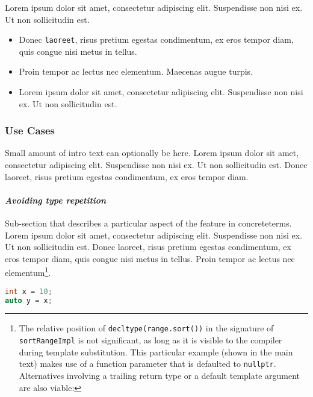\documentclass[twoside,10pt,letterpaper,usenames]{newstyle-PearsonGeneric-7-38}
\newcommand{\passthrough}[1]{\lstset{mathescape=false}#1\lstset{mathescape=true}}
\begin{document}
Lorem ipsum dolor sit amet, consectetur adipiscing elit. Suspendisse non
nisi ex. Ut non sollicitudin est.

\begin{itemize}
\item
  Donec \passthrough{\lstinline!laoreet!}, risus pretium egestas
  condimentum, ex eros tempor diam, quis congue nisi metus in tellus.
\item
  Proin tempor ac lectus nec elementum. Maecenas augue turpis.
\item
  Lorem ipsum dolor sit amet, consectetur adipiscing elit. Suspendisse
  non nisi ex. Ut non sollicitudin est.
\end{itemize}

\hypertarget{use-cases}{%
\subsubsection{Use Cases}\label{use-cases}}

Small amount of intro text can optionally be here. Lorem ipsum dolor sit
amet, consectetur adipiscing elit. Suspendisse non nisi ex. Ut non
sollicitudin est. Donec laoreet, risus pretium egestas condimentum, ex
eros tempor diam.

\hypertarget{avoiding-type-repetition}{%
\paragraph{\texorpdfstring{\emph{Avoiding type
repetition}}{Avoiding type repetition}}\label{avoiding-type-repetition}}

Sub-section that describes a particular aspect of the feature in
concreteterms. Lorem ipsum dolor sit amet, consectetur adipiscing elit.
Suspendisse non nisi ex. Ut non sollicitudin est. Donec laoreet, risus
pretium egestas condimentum, ex eros tempor diam, quis congue nisi metus
in tellus. Proin tempor ac lectus nec elementum\footnote{The relative
  position of \passthrough{\lstinline!decltype(range.sort())!} in the
  signature of \passthrough{\lstinline!sortRangeImpl!} is not
  significant, as long as it is visible to the compiler during template
  substitution. This particular example (shown in the main text) makes
  use of a function parameter that is defaulted to
  \passthrough{\lstinline!nullptr!}. Alternatives involving a trailing
  return type or a default template argument are also viable:}.

\begin{lstlisting}[language=C++, caption={ missing caption }, label={ testlabel }, frame=tb]
int x = 10;
auto y = x;
\end{lstlisting}
    
\end{document}

